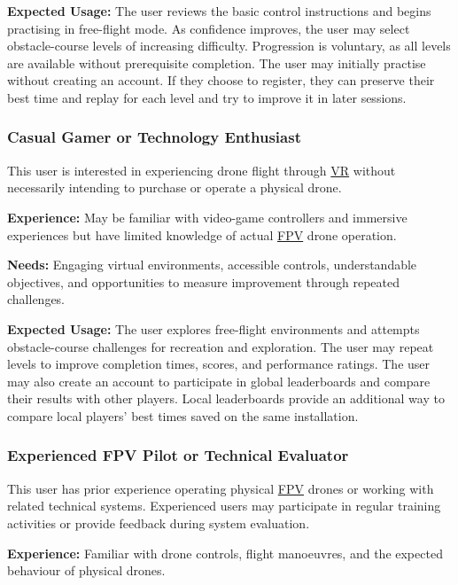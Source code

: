 \documentclass[12pt]{article}
\begin{document}
\noindent\textbf{Expected Usage:}
The user reviews the basic control instructions
and begins practising in free-flight mode.
As confidence improves, the user may select
obstacle-course levels of increasing difficulty.
Progression is voluntary, as all levels are
available without prerequisite completion.
The user may initially practise without creating
an account. If they choose to register, they
can preserve their best time and replay for each level and try to improve it
in later sessions.


\subsubsection{Casual Gamer or Technology Enthusiast}
\label{sec:casual-user}

This user is interested in experiencing drone
flight through \hyperlink{glos:VR}{VR} without necessarily intending
to purchase or operate a physical drone.

\noindent\textbf{Experience:}
May be familiar with video-game controllers and
immersive experiences but have limited knowledge
of actual \hyperlink{glos:FPV}{FPV} drone operation.

\noindent\textbf{Needs:}
Engaging virtual environments, accessible
controls, understandable objectives, and
opportunities to measure improvement through
repeated challenges.

\noindent\textbf{Expected Usage:}
The user explores free-flight environments
and attempts obstacle-course challenges for
recreation and exploration. The user may
repeat levels to improve completion times,
scores, and performance ratings. 
The user may also create an account to
participate in global leaderboards and compare
their results with other players. Local
leaderboards provide an additional way to
compare local players' best times saved on the same
installation.



\subsubsection{Experienced FPV Pilot or Technical Evaluator}
\label{sec:experienced-user}

This user has prior experience operating physical
\hyperlink{glos:FPV}{FPV} drones or working with related technical
systems. Experienced users may participate in
regular training activities or provide feedback
during system evaluation.

\noindent\textbf{Experience:}
Familiar with drone controls, flight manoeuvres,
and the expected behaviour of physical drones.
\end{document}
